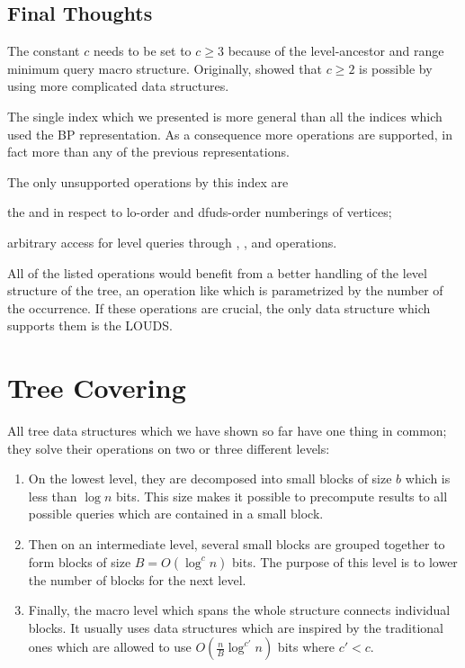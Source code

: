 \subsection{Final Thoughts}

The constant $c$ needs to be set to $c \ge 3$ because of the level-ancestor and range minimum query macro structure.
Originally, \cite{sadakane2010fully} showed that $c \ge 2$ is possible by using more complicated data structures.

\bigbreak

The single index which we presented is more general than all the indices which used the BP representation.
As a consequence more operations are supported, in fact more than any of the previous representations.

The only unsupported operations by this index are
\begin{enuminline}
	\item the \rank{} and \select{} in respect to lo-order and dfuds-order numberings of vertices;
	\item arbitrary access for level queries through \levelSize{}, \levelRank{}, and \levelSelect{} operations.
\end{enuminline}

All of the listed operations would benefit from a better handling of the level structure of the tree, an operation like \fwdSearch{} which is parametrized by the number of the occurrence.
If these operations are crucial, the only data structure which supports them is the LOUDS.

\section{Tree Covering}\label{s:TC}

All tree data structures which we have shown so far have one thing in common; they solve their operations on two or three different levels:
\begin{enumerate}
	\item On the lowest level, they are decomposed into small blocks of size $b$ which is less than $\log n$ bits.
	This size makes it possible to precompute results to all possible queries which are contained in a small block.
	
	\item Then on an intermediate level, several small blocks are grouped together to form blocks of size $B = O(\log^c n)$ bits.
	The purpose of this level is to lower the number of blocks for the next level.
	
	\item Finally, the macro level which spans the whole structure connects individual blocks.
	It usually uses data structures which are inspired by the traditional ones which are allowed to use $O\left(\frac{n}{B} \log^{c'} n\right)$ bits where $c' < c$.
\end{enumerate}

